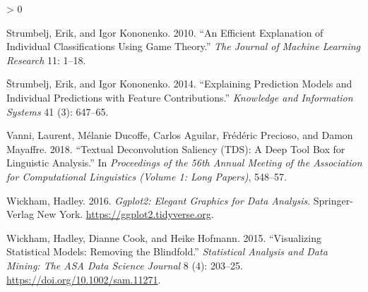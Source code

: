 \documentclass[
  article]{article}
\newlength{\cslhangindent}
\newenvironment{CSLReferences}[2] %
 {%
  \setlength{\parindent}{0pt}
  \ifodd #1 \everypar{\setlength{\hangindent}{\cslhangindent}}\ignorespaces\fi
  \ifnum #2 > 0
  \setlength{\parskip}{#2\baselineskip}
  \fi
 }%
 {}
\begin{document}
\begin{CSLReferences}{1}{0}
\leavevmode\hypertarget{ref-strumbelj_efficient_2010}{}%
Strumbelj, Erik, and Igor Kononenko. 2010. {``An Efficient Explanation of Individual Classifications Using Game Theory.''} \emph{The Journal of Machine Learning Research} 11: 1--18.

\leavevmode\hypertarget{ref-strumbelj_explaining_2014}{}%
Štrumbelj, Erik, and Igor Kononenko. 2014. {``Explaining Prediction Models and Individual Predictions with Feature Contributions.''} \emph{Knowledge and Information Systems} 41 (3): 647--65.

\leavevmode\hypertarget{ref-vanni_textual_2018}{}%
Vanni, Laurent, Mélanie Ducoffe, Carlos Aguilar, Frédéric Precioso, and Damon Mayaffre. 2018. {``Textual {Deconvolution} {Saliency} ({TDS}): A Deep Tool Box for Linguistic Analysis.''} In \emph{Proceedings of the 56th {Annual} {Meeting} of the {Association} for {Computational} {Linguistics} ({Volume} 1: {Long} {Papers})}, 548--57.

\leavevmode\hypertarget{ref-wickham_ggplot2_2016}{}%
Wickham, Hadley. 2016. \emph{Ggplot2: {Elegant} {Graphics} for {Data} {Analysis}}. Springer-Verlag New York. \url{https://ggplot2.tidyverse.org}.

\leavevmode\hypertarget{ref-wickham_visualizing_2015}{}%
Wickham, Hadley, Dianne Cook, and Heike Hofmann. 2015. {``Visualizing Statistical Models: {Removing} the Blindfold.''} \emph{Statistical Analysis and Data Mining: The ASA Data Science Journal} 8 (4): 203--25. \url{https://doi.org/10.1002/sam.11271}.

\end{CSLReferences}
\end{document}
